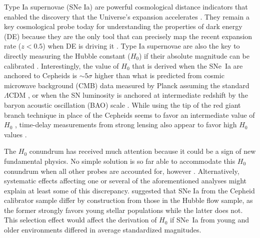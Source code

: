 \documentclass[]{aa}
\begin{document}
Type Ia supernovae (SNe Ia) are powerful cosmological distance indicators that
enabled the discovery that the Universe's expansion accelerates
\citep{riess1998, perlmutter1999}. They remain a key cosmological probe today
for understanding the properties of dark energy (DE) because they are the only
tool that can precisely map the recent expansion rate ($z<0.5$) when DE is
driving it \citep[e.g.,][]{scolnicastro2020}. Type Ia supernovae are also the
key to directly measuring the Hubble constant ($H_0$) if their absolute
magnitude can be calibrated \citep{riess2016, freedman2019}. Interestingly, the
value of $H_0$ that is derived when the SNe~Ia are anchored to Cepheids
\citep[the Supernovae, $H_0$, for the Equation of State of dark energy
project,][]{riess2009, riess2016} is $\sim5\sigma$ higher than what is predicted
from cosmic microwave background (CMB) data measured by Planck assuming the
standard $\Lambda$CDM \citep{planck2018, riess2019, reid2019}, or when the SN
luminosity is anchored at intermediate redshift by the baryon acoustic
oscillation (BAO) scale \citep{feeney2019}. While using the tip of the red giant
branch technique in place of the Cepheids seems to favor an intermediate value
of $H_0$ \citep{freedman2019, freedman2020}, time-delay measurements from strong
lensing also appear to favor high $H_0$ values \citep{wong2019}.

The $H_0$ conundrum has received much attention because it could be a sign of
new fundamental physics. No simple solution is so far able to accommodate this
$H_0$ conundrum when all other probes are accounted for, however
\citep{knox2019}. Alternatively, systematic effects affecting one or several of
the aforementioned analyses might explain at least some of this discrepancy.
\cite{rigault2015} suggested that SNe Ia from the Cepheid calibrator sample
differ by construction from those in the Hubble flow sample, as the former
strongly favors young stellar populations while the latter does not. This
selection effect would affect the derivation of $H_0$ if SNe~Ia from young and
older environments differed in average standardized magnitudes. 
\end{document}
